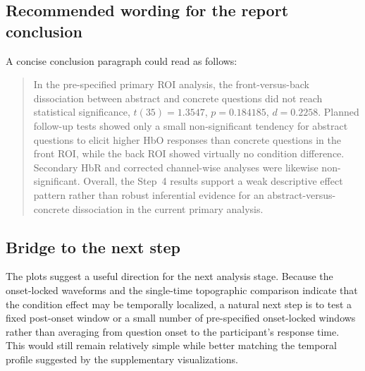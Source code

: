 \subsection{Recommended wording for the report conclusion}
A concise conclusion paragraph could read as follows:

\begin{quote}
In the pre-specified primary ROI analysis, the front-versus-back dissociation between abstract and
concrete questions did not reach statistical significance, $t(35)=1.3547$, $p=0.184185$,
$d=0.2258$.
Planned follow-up tests showed only a small non-significant tendency for abstract questions to elicit
higher HbO responses than concrete questions in the front ROI, while the back ROI showed virtually
no condition difference.
Secondary HbR and corrected channel-wise analyses were likewise non-significant.
Overall, the Step~4 results support a weak descriptive effect pattern rather than robust inferential
evidence for an abstract-versus-concrete dissociation in the current primary analysis.
\end{quote}

\subsection{Bridge to the next step}
The plots suggest a useful direction for the next analysis stage.
Because the onset-locked waveforms and the single-time topographic comparison indicate that the
condition effect may be temporally localized, a natural next step is to test a fixed post-onset window
or a small number of pre-specified onset-locked windows rather than averaging from question onset to
the participant's response time.
This would still remain relatively simple while better matching the temporal profile suggested by the
supplementary visualizations.
